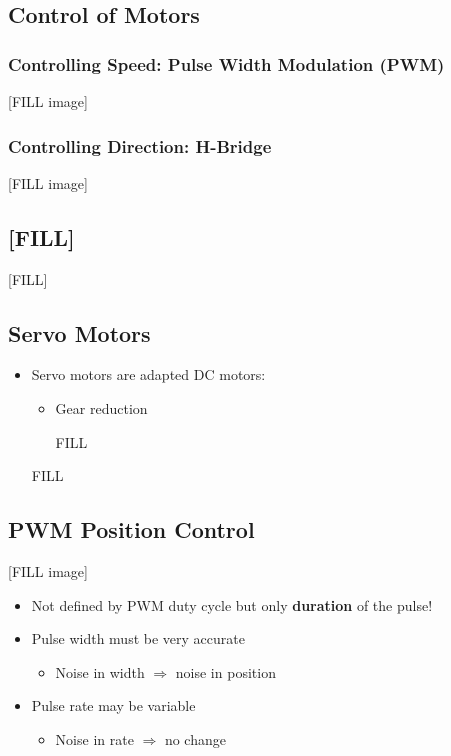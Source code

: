 \documentclass[10pt]{article}
\begin{document}
\subsection*{Control of Motors}
\subsubsection*{Controlling Speed: Pulse Width Modulation (PWM)}
[FILL image]
\subsubsection*{Controlling Direction: H-Bridge}
[FILL image]

\subsection*{[FILL]}
[FILL]

\subsection*{Servo Motors}
\begin{itemize}
	\item Servo motors are adapted DC motors:
	\begin{itemize}
        \item Gear reduction
        \item [FILL]
    \end{itemize}
    \item [FILL]
\end{itemize}

\subsection*{PWM Position Control}
[FILL image]
\begin{itemize}
	\item Not defined by PWM duty cycle but only \textbf{duration} of the pulse!
	\item Pulse width must be very accurate
	\begin{itemize}
        \item Noise in width $\Rightarrow$ noise in position
    \end{itemize}
    \item Pulse rate may be variable
    \begin{itemize}
        \item Noise in rate $\Rightarrow$ no change
    \end{itemize}
\end{itemize}
\end{document}
